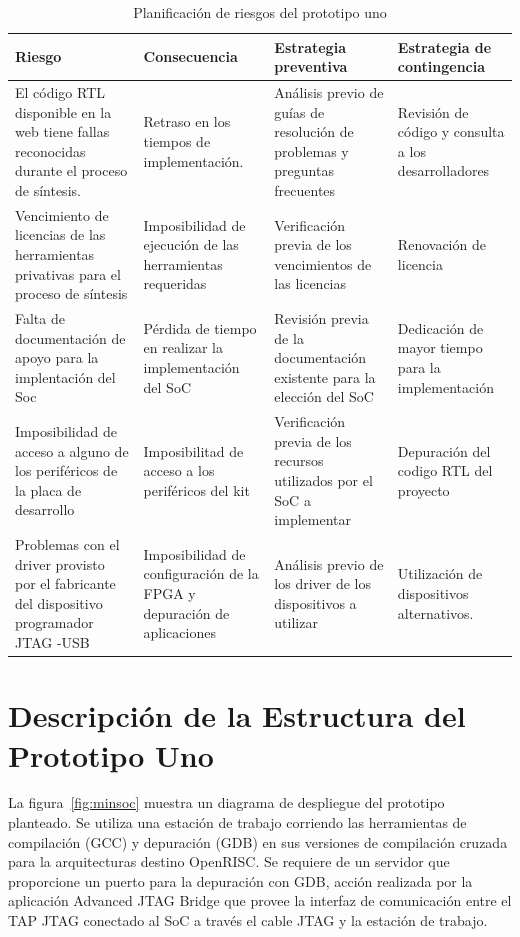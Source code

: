 		\begin{table}[h!]
		\centering
		\begin{tabular}{ p{4cm} p{4cm} p{4cm} p{3cm} }
		\hline 
		\rowcolor[gray]{0.8} Riesgo & Consecuencia & Estrategia preventiva & Estrategia de contingencia\\
		\hline
		El código RTL disponible en la web tiene fallas reconocidas durante el proceso de síntesis.&Retraso en los tiempos de implementación.& Análisis
		previo de guías de resolución de problemas y preguntas frecuentes & Revisión de código y consulta a los desarrolladores \\
		\hline
		Vencimiento de licencias de las herramientas privativas para el proceso de síntesis & Imposibilidad de ejecución de las herramientas requeridas & Verificación previa de los vencimientos de las licencias & Renovación de licencia \\	 
		\hline
		Falta de documentación de apoyo para la implentación
del Soc& Pérdida de tiempo en realizar la implementación
del SoC & Revisión previa de la documentación existente para la elección del
SoC & Dedicación de mayor tiempo para la implementación\\ 
		\hline
		 Imposibilidad de acceso a alguno de los periféricos de la placa de desarrollo & Imposibilitad de acceso a los periféricos del kit &Verificación previa de los recursos utilizados por el SoC a implementar & Depuración del codigo RTL del proyecto\\		
		\hline
		Problemas con el driver provisto por el fabricante del  dispositivo programador JTAG -USB  & Imposibilidad de configuración de la FPGA y depuración de aplicaciones &Análisis previo de los driver de los dispositivos a utilizar &  Utilización de dispositivos alternativos.\\		
		\hline
		\end{tabular}
		\caption{Planificación de riesgos del prototipo uno}
		\label{tab:planificación}
		\end{table}



		\newpage
		\section{Descripción de la Estructura del Prototipo Uno}
			
		La figura~\ref{fig:minsoc} muestra un diagrama de despliegue del prototipo planteado. Se utiliza una estación de trabajo corriendo las herramientas
		de compilación (GCC) y depuración (GDB) en sus versiones de compilación cruzada para la arquitecturas destino OpenRISC. Se requiere de un servidor que
		proporcione un puerto para la depuración con GDB, acción realizada por la aplicación Advanced JTAG Bridge que provee la interfaz de comunicación
		entre el TAP JTAG conectado al SoC a través el cable JTAG y la estación de trabajo.
		
